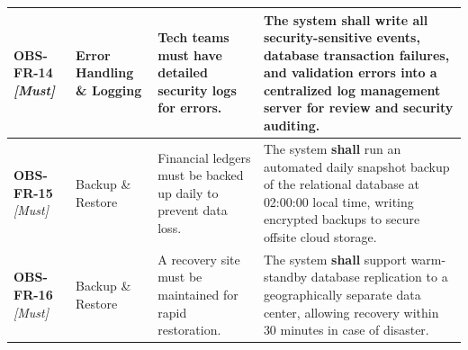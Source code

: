 \documentclass[11pt,a4paper]{article}
\begin{document}
\begin{table}[H]
\begin{tabular}{p{2.0cm} p{2.2cm} p{3.8cm} p{5.4cm}}
\textbf{OBS-FR-14} \newline \textit{\small [Must]} & Error Handling \& Logging & Tech teams must have detailed security logs for errors. & The system \textbf{shall} write all security-sensitive events, database transaction failures, and validation errors into a centralized log management server for review and security auditing. \\ \midrule

\textbf{OBS-FR-15} \newline \textit{\small [Must]} & Backup \& Restore & Financial ledgers must be backed up daily to prevent data loss. & The system \textbf{shall} run an automated daily snapshot backup of the relational database at 02:00:00 local time, writing encrypted backups to secure offsite cloud storage. \\ \midrule

\textbf{OBS-FR-16} \newline \textit{\small [Must]} & Backup \& Restore & A recovery site must be maintained for rapid restoration. & The system \textbf{shall} support warm-standby database replication to a geographically separate data center, allowing recovery within 30 minutes in case of disaster. \\ \bottomrule
\end{tabular}
\end{table}
\end{document}
